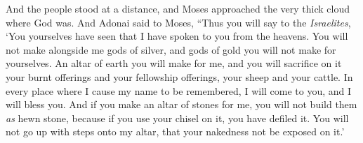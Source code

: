 \begin{biblechapter}
\verse And the people stood at a distance, and Moses approached the very thick cloud where God was.
 And Adonai said to Moses, “Thus you will say to the \textit{Israelites}, ‘You yourselves have seen that I have spoken to you from the heavens.
\verse You will not make alongside me gods of silver, and gods of gold you will not make for yourselves.
\verse An altar of earth you will make for me, and you will sacrifice on it your burnt offerings and your fellowship offerings, your sheep and your cattle. In every place where I cause my name to be remembered, I will come to you, and I will bless you.
\verse And if you make an altar of stones for me, you will not build them \textit{as} hewn stone, because if you use your chisel on it, you have defiled it.
\verse You will not go up with steps onto my altar, that your nakedness not be exposed on it.’
\end{biblechapter}

